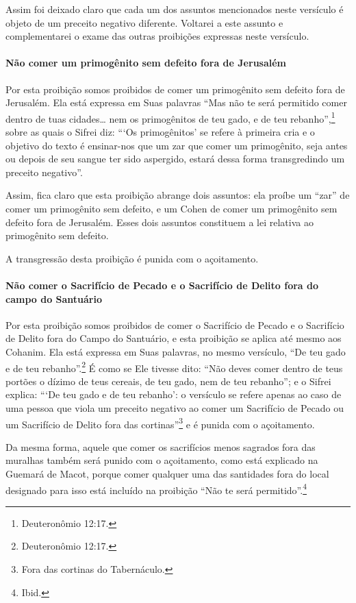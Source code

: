 Assim foi deixado claro que cada um dos assuntos mencionados neste
versículo é objeto de um preceito negativo diferente. Voltarei a este
assunto e complementarei o exame das outras proibições expressas neste
versículo.

\paragraph{Não comer um primogênito sem defeito fora de Jerusalém}

Por esta proibição somos proibidos de comer um primogênito sem defeito
fora de Jerusalém. Ela está expressa em Suas palavras ``Mas não te será
permitido comer dentro de tuas cidades\ldots{} nem os primogênitos de teu
gado, e de teu rebanho'',\footnote{Deuteronômio 12:17.} sobre as quais o Sifrei
diz: ```Os primogênitos' se refere à primeira cria e o objetivo do
texto é ensinar-nos que um zar\starr{} que comer um primogênito, seja antes ou depois de seu sangue ter sido aspergido,
estará dessa forma transgredindo um preceito negativo''.

Assim, fica claro que esta proibição abrange dois assuntos: ela proíbe
um ``zar'' de comer um primogênito sem defeito, e um Cohen de comer
um primogênito sem defeito fora de Jerusalém. Esses dois assuntos
constituem a lei relativa ao primogênito sem defeito.

A transgressão desta proibição é punida com o açoitamento.

\paragraph{Não comer o Sacrifício de Pecado e o Sacrifício de Delito fora do campo do
Santuário}

Por esta proibição somos proibidos de comer o Sacrifício de Pecado e o
Sacrifício de Delito fora do Campo do Santuário, e esta proibição se
aplica até mesmo aos Cohanim. Ela está expressa em Suas palavras, no
mesmo versículo, ``De teu gado e de teu rebanho''.\footnote{Deuteronômio 12:17.}
É como se Ele
tivesse dito: ``Não deves comer dentro de teus portões o dízimo de teus
cereais, de teu gado, nem de teu rebanho''; e o Sifrei explica: ```De
teu gado e de teu rebanho': o versículo se refere apenas ao caso de uma
pessoa que viola um preceito negativo ao comer um Sacrifício de Pecado
ou um Sacrifício de Delito fora das cortinas''\footnote{Fora das cortinas do Tabernáculo.} e é punida com o açoitamento.

Da mesma forma, aquele que comer os sacrifícios menos sagrados fora das
muralhas também será punido com o açoitamento, como está explicado na
Guemará de Macot, porque comer qualquer uma das santidades fora do local
designado para isso está incluído na proibição ``Não te será permitido''.\footnote{Ibid.}

